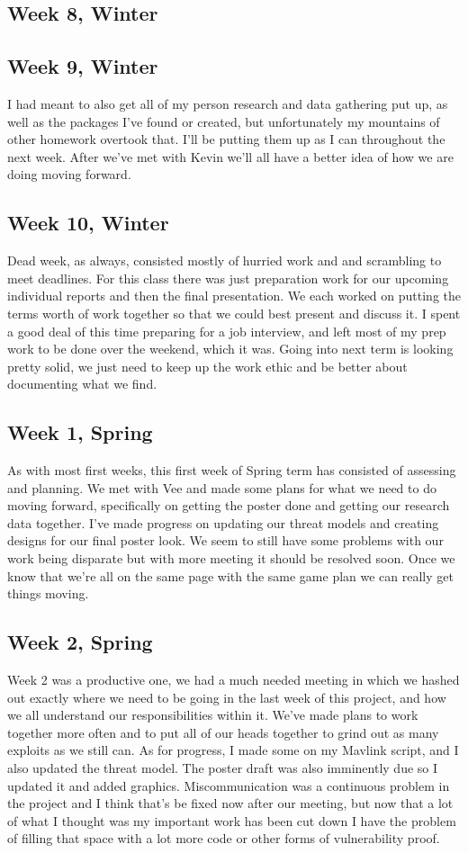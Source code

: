 \documentclass[IEEEtran,letterpaper,10pt,notitlepage,draftclsnofoot,onecolumn]{article}
\begin{document}
\subsection{Week 8, Winter}
\subsection{Week 9, Winter}
I had meant to also get all of my person research and data gathering put up, as well as the packages I've found or created, but unfortunately my mountains of other homework overtook that. I'll be putting them up as I can throughout the next week. After we've met with Kevin we'll all have a better idea of how we are doing moving forward.
\subsection{Week 10, Winter}
Dead week, as always, consisted mostly of hurried work and and scrambling to meet deadlines. For this class there was just preparation work for our upcoming individual reports and then the final presentation. We each worked on putting the terms worth of work together so that we could best present and discuss it. I spent a good deal of this time preparing for a job interview, and left most of my prep work to be done over the weekend, which it was. Going into next term is looking pretty solid, we just need to keep up the work ethic and be better about documenting what we find.
\subsection{Week 1, Spring}
As with most first weeks, this first week of Spring term has consisted of assessing and planning. We met with Vee and made some plans for what we need to do moving forward, specifically on getting the poster done and getting our research data together. I've made progress on updating our threat models and creating designs for our final poster look. We seem to still have some problems with our work being disparate but with more meeting it should be resolved soon. Once we know that we're all on the same page with the same game plan we can really get things moving.
\subsection{Week 2, Spring}
Week 2 was a productive one, we had a much needed meeting in which we hashed out exactly where we need to be going in the last week of this project, and how we all understand our responsibilities within it. We've made plans to work together more often and to put all of our heads together to grind out as many exploits as we still can. As for progress, I made some on my Mavlink script, and I also updated the threat model. The poster draft was also imminently due so I updated it and added graphics. Miscommunication was a continuous problem in the project and I think that's be fixed now after our meeting, but now that a lot of what I thought was my important work has been cut down I have the problem of filling that space with a lot more code or other forms of vulnerability proof.
\end{document}
